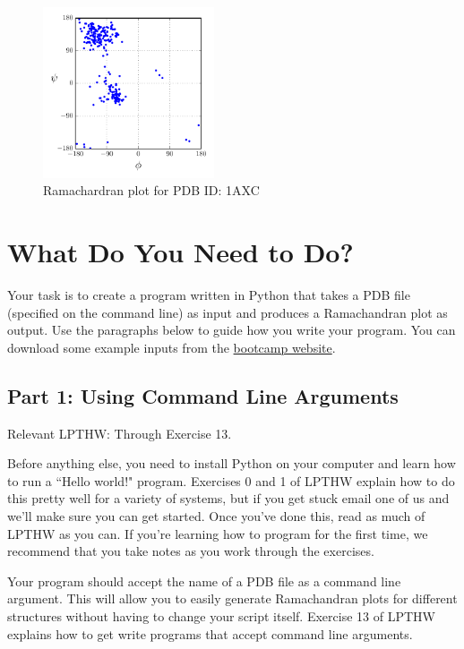 \documentclass{article}
\newenvironment{lpthw}
{Relevant LPTHW:}
{}
\begin{document}
\begin{figure}[h]
 \centering
 \includegraphics[width=0.45\textwidth]{example-plot}
 \caption{Ramachardran plot for PDB ID: 1AXC}
 \label{fig:example-plot}
\end{figure}

\section{What Do You Need to Do?}

Your task is to create a program written in Python that takes a PDB file 
(specified on the command line) as input and produces a Ramachandran plot as 
output.  Use the paragraphs below to guide how you write your  program.  You 
can download some example inputs from the
\href{http://bootcamp.ipqb.org/programming}{bootcamp website}.

\subsection{Part 1: Using Command Line Arguments}

\begin{lpthw}
Through Exercise 13.
\end{lpthw}

Before anything else, you need to install Python on your computer and learn how 
to run a ``Hello world!" program.  Exercises 0 and 1 of LPTHW explain how to do 
this pretty well for a variety of systems, but if you get stuck email one of us 
and we'll make sure you can get started.  Once you've done this, read as much 
of LPTHW as you can.  If you're learning how to program for the first time, we 
recommend that you take notes as you work through the exercises.

Your program should accept the name of a PDB file as a command line argument.  
This will allow you to easily generate Ramachandran plots for different 
structures without having to change your script itself.  Exercise 13 of LPTHW 
explains how to get write programs that accept command line arguments.
\end{document}
